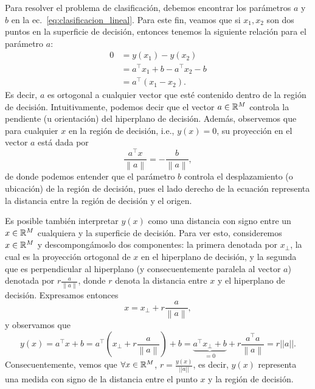Para resolver el problema de clasificación, debemos encontrar los parámetros $a$ y $b$ en la ec.~\eqref{eq:clasificacion_lineal}. Para este fin, veamos que si $x_1,x_2$ son dos puntos en la superficie de decisión, entonces tenemos la siguiente relación para el parámetro $a$:
\begin{align}
	0 &= y(x_1) - y(x_2) \nonumber\\
	  &= a^\top x_1 + b - a^\top x_2 - b \nonumber\\
	  &= a^\top (x_1-x_2).
\end{align}
Es decir, $a$ es ortogonal a cualquier vector que esté contenido dentro de la región de decisión. Intuitivamente, podemos decir que el vector $a\in{\mathbb R}^M$ controla la pendiente (u orientación) del hiperplano de decisión. Además, observemos que para cualquier $x$ en la región de decisión, i.e., $y(x)=0$,  su proyección en el vector $a$ está dada por  
\begin{equation}
	\frac{a^\top x}{\left \| a \right \|} = -\frac{b}{\left \| a \right \|},
\end{equation}
de donde podemos entender que el parámetro $b$ controla el desplazamiento (o ubicación) de la región de decisión,  pues el lado derecho de la ecuación representa la distancia entre la región de decisión y el origen.

Es posible  también interpretar $y(x)$ como una distancia con signo entre un $x\in{\mathbb R}^M$ cualquiera  y la superficie de decisión. Para ver esto, consideremos $x\in{\mathbb R}^M$ y descompongámoslo dos componentes: la primera denotada por $x_{\bot}$, la cual es la proyección ortogonal de $x$ en el hiperplano de  decisión, y la segunda que es perpendicular al hiperplano (y consecuentemente paralela al vector $a$) denotada por $r\frac{a}{\left \| a \right \|}$, donde $r$ denota la distancia entre $x$ y el  hiperplano de  decisión. Expresamos entonces  
\begin{equation}
	x = x_{\bot}+r\frac{a}{\left \| a \right \|},
\end{equation}
y observamos que
\begin{equation}
	y(x) 
	= a^\top x+b 
	=a^\top  \left( x_{\bot} + r\frac{a}{\left \| a \right \|} \right) +b 
	= \underbrace{a^\top x_{\bot} +b }_{=0} +   r\frac{a^\top  a}{\left \| a \right \|}
	= r||a||.
\end{equation}
Consecuentemente, vemos que $\forall x\in{\mathbb R}^M$, $r = \frac{y(x)}{||a||}$,  es decir, $y(x)$ representa una medida con signo de la  distancia entre el punto $x$ y la  región de decisión. 

